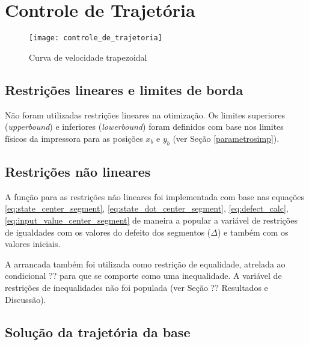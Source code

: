 \section{Controle de Trajetória}

\begin{figure}[H]
    \centering
    \caption{Curva de velocidade trapezoidal}
    \texttt{[image: controle\_de\_trajetoria]}

    \label{fig:controle_de_trajetoria}
\end{figure}

\subsection{Restrições lineares e limites de borda}

Não foram utilizadas restrições lineares na otimização. Os limites superiores (\textit{upperbound}) e inferiores (\textit{lowerbound}) foram definidos com base nos limites físicos da impressora para as posições $x_b$ e $y_b$ (ver Seção \ref{parametrosimp}).

\subsection{Restrições não lineares}

A função para as restrições não lineares foi implementada com base nas equações \ref{eq:state_center_segment}, \ref{eq:state_dot_center_segment}, \ref{eq:defect_calc}, \ref{eq:input_value_center_segment} de maneira a popular a variável de restrições de igualdades com os valores do defeito dos segmentos ($\Delta$) e também com os valores iniciais. 

A arrancada também foi utilizada como restrição de equalidade, atrelada ao condicional ?? para que se comporte como uma inequalidade. A variável de restrições de inequalidades não foi populada (ver Seção ?? Resultados e Discussão).



\subsection{Solução da trajetória da base}

